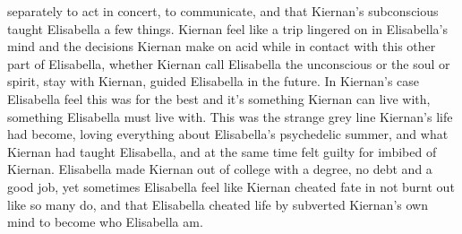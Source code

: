 \documentclass[12pt]{book}
\begin{document}
separately to act in concert, to communicate, and that Kiernan's subconscious taught Elisabella a few things. Kiernan feel like a trip lingered on in Elisabella's mind and the decisions Kiernan make on acid while in contact with this other part of Elisabella, whether Kiernan call Elisabella the unconscious or the soul or spirit, stay with Kiernan, guided Elisabella in the future. In Kiernan's case Elisabella feel this was for the best and it's something Kiernan can live with, something Elisabella must live with. This was the strange grey line Kiernan's life had become, loving everything about Elisabella's psychedelic summer, and what Kiernan had taught Elisabella, and at the same time felt guilty for imbibed of Kiernan. Elisabella made Kiernan out of college with a degree, no debt and a good job, yet sometimes Elisabella feel like Kiernan cheated fate in not burnt out like so many do, and that Elisabella cheated life by subverted Kiernan's own mind to become who Elisabella am.
\end{document}
